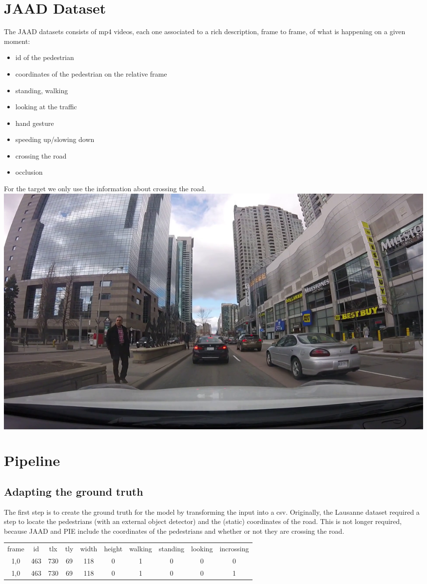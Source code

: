 \documentclass[11pt]{article}
\begin{document}
\section{JAAD Dataset}
    The JAAD datasets consists of mp4 videos, each one associated to a rich description, frame to frame, of what is happening on a given moment:
    \begin{itemize}
        \item id of the pedestrian
        \item coordinates of the pedestrian on the relative frame
        \item standing, walking
        \item looking at the traffic
        \item hand gesture
        \item speeding up/slowing down
        \item crossing the road
        \item occlusion
    \end{itemize}
    For the target we only use the information about crossing the road.\\
    \includegraphics[width=\textwidth]{jaadscene}\\

\section{Pipeline}
\subsection*{Adapting the ground truth}
    The first step is to create the ground truth for the model by transforming the input into a csv.
    Originally, the Lausanne dataset required a step to locate the pedestrians (with an external object detector)
    and the (static) coordinates of the road.
    This is not longer required, because JAAD and PIE include the coordinates of the pedestrians and whether or not
    they are crossing the road.
    \begin{center}
    \begin{tabular}{ c c c c c c c c c c}
     frame & id & tlx & tly & width & height & walking & standing & looking & incrossing\\
     1,0 & 463 & 730 & 69 & 118 & 0 & 1 & 0 & 0 & 0\\
     1,0 & 463 & 730 & 69 & 118 & 0 & 1 & 0 & 0 & 1\\
    \end{tabular}
    \end{center}
\end{document}

